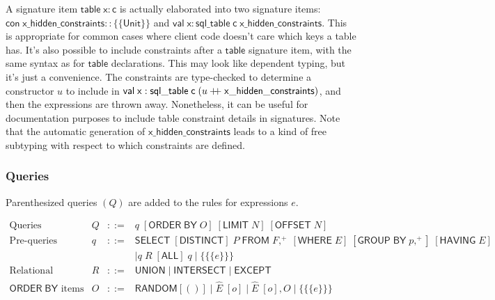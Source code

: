 \documentclass{article}
\newcommand{\mt}[1]{\mathsf{#1}}
\newcommand{\rc}{+ \hspace{-.075in} + \;}
\begin{document}
A signature item $\mt{table} \; \mt{x} : \mt{c}$ is actually elaborated into two signature items: $\mt{con} \; \mt{x\_hidden\_constraints} :: \{\{\mt{Unit}\}\}$ and $\mt{val} \; \mt{x} : \mt{sql\_table} \; \mt{c} \; \mt{x\_hidden\_constraints}$.  This is appropriate for common cases where client code doesn't care which keys a table has.  It's also possible to include constraints after a $\mt{table}$ signature item, with the same syntax as for $\mt{table}$ declarations.  This may look like dependent typing, but it's just a convenience.  The constraints are type-checked to determine a constructor $u$ to include in $\mt{val} \; \mt{x} : \mt{sql\_table} \; \mt{c} \; (u \rc \mt{x\_hidden\_constraints})$, and then the expressions are thrown away.  Nonetheless, it can be useful for documentation purposes to include table constraint details in signatures.  Note that the automatic generation of $\mt{x\_hidden\_constraints}$ leads to a kind of free subtyping with respect to which constraints are defined.


\subsubsection{Queries}

Parenthesized queries $(Q)$ are added to the rules for expressions $e$.

$$\begin{array}{rrcll}
  \textrm{Queries} & Q &::=& q \; [\mt{ORDER} \; \mt{BY} \; O] \; [\mt{LIMIT} \; N] \; [\mt{OFFSET} \; N] \\
  \textrm{Pre-queries} & q &::=& \mt{SELECT} \; [\mt{DISTINCT}] \; P \; \mt{FROM} \; F,^+ \; [\mt{WHERE} \; E] \; [\mt{GROUP} \; \mt{BY} \; p,^+] \; [\mt{HAVING} \; E] \\
  &&& \mid q \; R \; [\mt{ALL}] \; q \mid \{\{\{e\}\}\} \\
  \textrm{Relational operators} & R &::=& \mt{UNION} \mid \mt{INTERSECT} \mid \mt{EXCEPT} \\
  \textrm{$\mt{ORDER \; BY}$ items} & O &::=& \mt{RANDOM} [()] \mid \hat{E} \; [o] \mid \hat{E} \; [o], O \mid \{\{\{e\}\}\}
\end{array}$$
\end{document}
